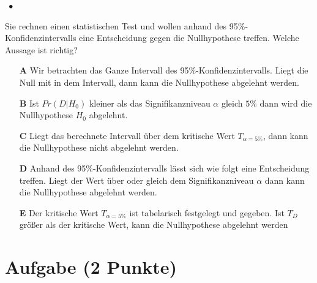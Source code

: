 \documentclass[a4paper, 9pt]{scrartcl}\usepackage[]{graphicx}\usepackage[]{xcolor}
\begin{document}
\ifcollection
\begin{flushright}
\tiny\vspace{-2Ex}
\textbf{\examinhaltstart}
\exammodulestatversuch $\;\bullet$
\exammodulebiostat
\vspace{-1Ex}
\end{flushright}
\fi






Sie rechnen einen statistischen Test und wollen anhand des 95\%-Konfidenzintervalls eine Entscheidung gegen die Nullhypothese treffen. Welche Aussage ist richtig?





\begin{enumerate}
\item [\textbf{A} \msquare] Wir betrachten das Ganze Intervall des 95\%-Konfidenzintervalls. Liegt die Null mit in dem Intervall, dann kann die Nullhypothese abgelehnt werden.
\item [\textbf{B} \msquare] Ist $Pr(D|H_0)$ kleiner als das Signifikanzniveau $\alpha$ gleich $5\%$ dann wird die Nullhypothese $H_0$ abgelehnt.
\item [\textbf{C} \msquare] Liegt das berechnete Intervall über dem kritische Wert $T_{\alpha = 5\%}$, dann kann die Nullhypothese nicht abgelehnt werden.
\item [\textbf{D} \msquare] Anhand des 95\%-Konfidenzintervalls lässt sich wie folgt eine Entscheidung treffen. Liegt der Wert über oder gleich dem Signifikanzniveau $\alpha$ dann kann die Nullhypothese abgelehnt werden.
\item [\textbf{E} \msquare] Der kritische Wert $T_{\alpha = 5\%}$ ist tabelarisch festgelegt und gegeben. Ist $T_{D}$ größer als der kritische Wert, kann die Nullhypothese abgelehnt werden
\end{enumerate}

\section{Aufgabe \hfill (2 Punkte)}

\ifcollection
\begin{flushright}
\tiny\vspace{-2Ex}
\textbf{\examinhaltstart}
\exammodulebiostat
\vspace{-1Ex}
\end{flushright}
\fi
\end{document}

